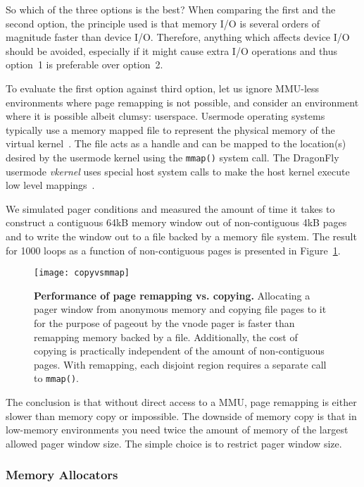So which of the three options is the best?  When comparing the first
and the second option, the principle used is that memory I/O is several
orders of magnitude faster than device I/O.  Therefore, anything which
affects device I/O should be avoided, especially if it might cause extra
I/O operations and thus option~1 is preferable over option~2.

To evaluate the first option against third option, let us ignore
MMU-less environments where page remapping is not possible, and
consider an environment where it is possible albeit clumsy: userspace.
Usermode operating systems typically use a memory mapped file to represent
the physical memory of the virtual kernel~\cite{dike:uml,eco:vkernel}.
The file acts as a handle and can be mapped to the location(s) desired by
the usermode kernel using the \texttt{mmap()} system call.  The DragonFly
usermode \textit{vkernel} uses special host system calls to make the
host kernel execute low level mappings~\cite{eco:vkernel}.

We simulated pager conditions and measured the amount of time it takes to
construct a contiguous 64kB memory window out of non-contiguous 4kB pages
and to write the window out to a file backed by a memory file system.
The result for 1000 loops as a function of non-contiguous pages is
presented in Figure~\ref{fig:copyvsmmap}.

\begin{figure}[t]
\texttt{[image: copyvsmmap]}
\caption[Performance of page remapping vs. copying]{
\textbf{Performance of page remapping vs. copying.}
Allocating a pager window from anonymous memory and copying file
pages to it for the purpose of pageout by the vnode pager is faster
than remapping memory backed by a file.  Additionally, the cost of
copying is practically independent of the amount of non-contiguous
pages.  With remapping, each disjoint region requires a separate
call to \texttt{mmap()}.}
\label{fig:copyvsmmap}
\end{figure}

The conclusion is that without direct access to a MMU, page remapping is
either slower than memory copy or impossible.  The downside of memory
copy is that in low-memory environments you need twice the amount of
memory of the largest allowed pager window size.  The simple choice is
to restrict pager window size.

\subsubsection{Memory Allocators}
\label{sect:malloc}

